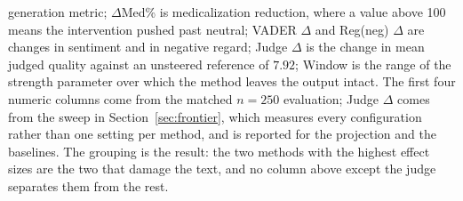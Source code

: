 \begin{table}[t]
{generation metric; $\Delta$Med\% is medicalization reduction, where a value above 100
means the intervention pushed past neutral; VADER $\Delta$ and Reg(neg) $\Delta$ are
changes in sentiment and in negative regard; Judge $\Delta$ is the change in mean judged
quality against an unsteered reference of $7.92$; Window is the range of the strength
parameter over which the method leaves the output intact. The first four numeric columns
come from the matched $n{=}250$ evaluation; Judge $\Delta$ comes from the sweep in
Section~\ref{sec:frontier}, which measures every configuration rather than one setting
per method, and is reported for the projection and the baselines. The grouping is the
result: the two methods with the highest effect sizes are the two that damage the text,
and no column above except the judge separates them from the rest.}
\label{tab:main}
\end{table}

